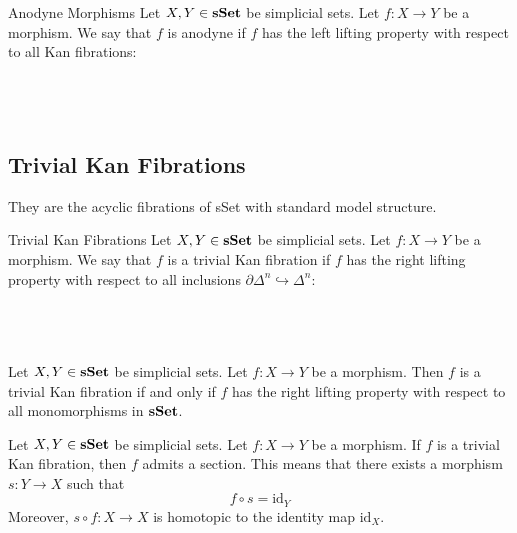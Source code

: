 \documentclass[a4paper]{article}
\begin{document}
\begin{defn}{Anodyne Morphisms}{} Let $X,Y\in\bold{sSet}$ be simplicial sets. Let $f:X\to Y$ be a morphism. We say that $f$ is anodyne if $f$ has the left lifting property with respect to all Kan fibrations: \\~\\
\\~\\
\end{defn}

\subsection{Trivial Kan Fibrations}
They are the acyclic fibrations of sSet with standard model structure. 

\begin{defn}{Trivial Kan Fibrations}{} Let $X,Y\in\bold{sSet}$ be simplicial sets. Let $f:X\to Y$ be a morphism. We say that $f$ is a trivial Kan fibration if $f$ has the right lifting property with respect to all inclusions $\partial\Delta^n\hookrightarrow\Delta^n$: \\~\\
\\~\\
\end{defn}

\begin{prp}{}{} Let $X,Y\in\bold{sSet}$ be simplicial sets. Let $f:X\to Y$ be a morphism. Then $f$ is a trivial Kan fibration if and only if $f$ has the right lifting property with respect to all monomorphisms in $\bold{sSet}$. 
\end{prp}

\begin{crl}{}{} Let $X,Y\in\bold{sSet}$ be simplicial sets. Let $f:X\to Y$ be a morphism. If $f$ is a trivial Kan fibration, then $f$ admits a section. This means that there exists a morphism $s:Y\to X$ such that $$f\circ s=\text{id}_Y$$ Moreover, $s\circ f:X\to X$ is homotopic to the identity map $\text{id}_X$. 
\end{crl}
\end{document}
